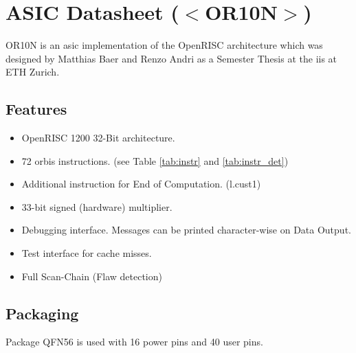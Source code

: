 \chapter{ASIC Datasheet ($<$OR10N$>$)}

OR10N is an \gls{asic} implementation of the OpenRISC architecture which was designed by Matthias Baer and Renzo Andri as a Semester Thesis at the \gls{iis} at ETH Zurich. 


\minitoc 

\section{Features}
\begin{itemize}
\item OpenRISC 1200 32-Bit architecture.
\item 72 \gls{orbis} instructions. (see Table \ref{tab:instr} and \ref{tab:instr_det})
\item Additional instruction for End of Computation. (l.cust1)
\item 33-bit signed (hardware) multiplier.
\item Debugging interface. Messages can be printed character-wise on Data Output.
\item Test interface for cache misses.
\item Full Scan-Chain (Flaw detection)
\end{itemize}





\section{Packaging}
Package QFN56 is used with 16 power pins and 40 user pins.

